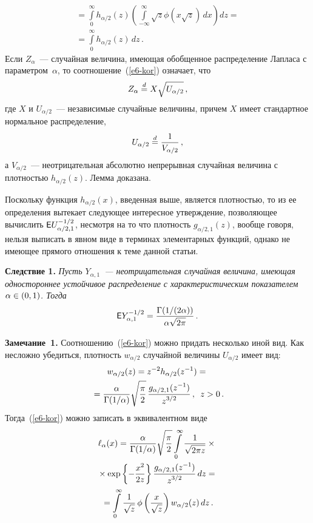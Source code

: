 \begin{multicols}{2}
\begin{multline*}
{}\\
{}=\int\limits_{0}^{\infty}h_{\alpha/2}(z)\left(\int\limits_{-\infty}^{\infty}\sqrt{z}
\phi\left(x\sqrt{z}\right)\,dx\right)dz={}\\
{}=
\int\limits_{0}^{\infty}h_{\alpha/2}(z)\,dz\,.
\end{multline*}
Если $Z_{\alpha}$~--- случайная величина, имеющая обобщенное
распределение Лапласа с параметром~$\alpha$, то соотношение~(\ref{e6-kor})
означает, что
$$
Z_{\alpha}\stackrel{d}{=} X \sqrt{U_{\alpha/2}}\,,
$$
где $X$ и $U_{\alpha/2}$~--- независимые случайные величины, причем
$X$ имеет стандартное нормальное распределение,
$$
U_{\alpha/2}\stackrel{d}{=}\displaystyle\frac{\displaystyle 1\mathstrut}{\displaystyle V_{\alpha/2}\mathstrut}\,,
$$
а $V_{\alpha/2}$~--- неотрицательная абсолютно непрерывная случайная
величина с плотностью $h_{\alpha/2}(z)$. Лемма доказана.

\smallskip

Поскольку функция $h_{\alpha/2}(x)$, введенная выше, является
плотностью, то из ее определения вытекает следующее интересное
утверждение, позволяющее вычислить ${\sf E}U_{\alpha/2,1}^{-1/2}$,
несмотря на то что плот\-ность $g_{\alpha/2,1}(z)$, вообще говоря,
нельзя выписать в явном виде в терминах элементарных функций, однако
не имеющее прямого отношения к теме данной статьи.

\smallskip

\noindent
\textbf{Следствие 1.} {\it Пусть $Y_{\alpha,1}$~--- неотрицательная
случайная величина, имеющая одностороннее устойчивое распределение с
характеристическим показателем $\alpha\hm\in(0,1)$. Тогда}
$$
{\sf E}Y^{-1/2}_{\alpha,1}=\displaystyle\frac{\displaystyle \Gamma({1}/(2\alpha))\mathstrut}{\displaystyle \alpha\sqrt{2\pi}\mathstrut}\,.
$$

\smallskip

\noindent
\textbf{Замечание~1.} Соотношению~(\ref{e6-kor}) можно придать несколько иной вид.
Как несложно убедиться, плотность $w_{\alpha/2}$ случайной величины
$U_{\alpha/2}$ имеет вид:
\begin{multline*}
w_{\alpha/2}(z)=z^{-2}h_{\alpha/2}(z^{-1})={}\\
{}=
\displaystyle\frac{\displaystyle \alpha\mathstrut}{\displaystyle \Gamma({1}/{\alpha})\mathstrut}\sqrt{\displaystyle\frac{\displaystyle \pi\mathstrut}{\displaystyle 2\mathstrut}}\,\displaystyle\frac{\displaystyle g_{\alpha/2,1}(z^{-1})\mathstrut}{\displaystyle z^{3/2}\mathstrut}\,,\enskip
z>0\,.
\end{multline*}
Тогда~(\ref{e6-kor}) можно записать в эквивалентном виде
\begin{multline}
\ell_{\alpha}(x)=
\displaystyle\frac{\displaystyle \alpha\mathstrut}{\displaystyle \Gamma({1}/{\alpha})\mathstrut}\sqrt{\displaystyle\frac{\displaystyle \pi\mathstrut}{\displaystyle 2\mathstrut}}\int\limits_0^{\infty}
\displaystyle\frac{\displaystyle 1\mathstrut}{\displaystyle \sqrt{2\pi
z}\mathstrut}\times{}\\
{}\times\exp\left\{-\displaystyle\frac{\displaystyle x^2\mathstrut}{\displaystyle 2z\mathstrut}\right\}\displaystyle\frac{\displaystyle g_{\alpha/2,1}(z^{-1})\mathstrut}{\displaystyle z^{3/2}\mathstrut}\,dz={}\\
{}=
\int\limits_0^{\infty}\displaystyle\frac{\displaystyle 1\mathstrut}{\displaystyle \sqrt{z}\mathstrut}\,\phi\left(\displaystyle\frac{\displaystyle x\mathstrut}{\displaystyle \sqrt{z}\mathstrut}\right)w_{\alpha/2}(z)\,dz\,.
\label{e7-kor}
\end{multline}


\end{multicols}
